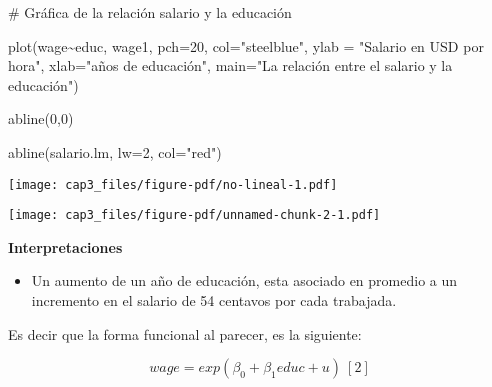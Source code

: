 \documentclass[
  letterpaper,
  DIV=11,
  numbers=noendperiod]{scrreprt}
\newenvironment{Shaded}{\begin{snugshade}}{\end{snugshade}}
\newcommand{\AttributeTok}[1]{\textcolor[rgb]{0.40,0.45,0.13}{#1}}
\newcommand{\CommentTok}[1]{\textcolor[rgb]{0.37,0.37,0.37}{#1}}
\newcommand{\DecValTok}[1]{\textcolor[rgb]{0.68,0.00,0.00}{#1}}
\newcommand{\FunctionTok}[1]{\textcolor[rgb]{0.28,0.35,0.67}{#1}}
\newcommand{\NormalTok}[1]{\textcolor[rgb]{0.00,0.23,0.31}{#1}}
\newcommand{\SpecialCharTok}[1]{\textcolor[rgb]{0.37,0.37,0.37}{#1}}
\newcommand{\StringTok}[1]{\textcolor[rgb]{0.13,0.47,0.30}{#1}}
\providecommand{\tightlist}{%
  \setlength{\itemsep}{0pt}\setlength{\parskip}{0pt}}\usepackage{longtable,booktabs,array}
\begin{document}
\begin{Shaded}
\begin{Highlighting}[]
\CommentTok{\# Gráfica de la relación salario y la educación}

\FunctionTok{plot}\NormalTok{(wage}\SpecialCharTok{\textasciitilde{}}\NormalTok{educ, }
\NormalTok{     wage1,}
     \AttributeTok{pch=}\DecValTok{20}\NormalTok{,}
     \AttributeTok{col=}\StringTok{"steelblue"}\NormalTok{,}
     \AttributeTok{ylab =} \StringTok{"Salario en USD por hora"}\NormalTok{,}
     \AttributeTok{xlab=}\StringTok{"años de educación"}\NormalTok{,}
     \AttributeTok{main=}\StringTok{"La relación entre el salario y la educación"}\NormalTok{)}

\FunctionTok{abline}\NormalTok{(}\DecValTok{0}\NormalTok{,}\DecValTok{0}\NormalTok{)}

\FunctionTok{abline}\NormalTok{(salario.lm, }
       \AttributeTok{lw=}\DecValTok{2}\NormalTok{,}
       \AttributeTok{col=}\StringTok{"red"}\NormalTok{)}
\end{Highlighting}
\end{Shaded}

\texttt{[image: cap3\_files/figure-pdf/no-lineal-1.pdf]}

\begin{Shaded}
\end{Shaded}

\texttt{[image: cap3\_files/figure-pdf/unnamed-chunk-2-1.pdf]}

\textbf{Interpretaciones}

\begin{itemize}
\tightlist
\item
  Un aumento de un año de educación, esta asociado en promedio a un
  incremento en el salario de 54 centavos por cada trabajada.
\end{itemize}

Es decir que la forma funcional al parecer, es la siguiente:

\[wage=exp(\beta_0+\beta_1educ+u)\ [2]\]
\end{document}
